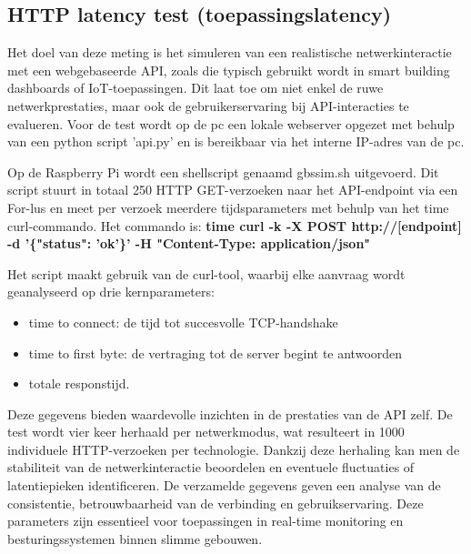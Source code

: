 \subsection{HTTP latency test (toepassingslatency)}
Het doel van deze meting is het simuleren van een realistische netwerkinteractie met een webgebaseerde API, zoals die typisch gebruikt wordt in smart building dashboards of IoT-toepassingen. Dit laat toe om niet enkel de ruwe netwerkprestaties, maar ook de gebruikerservaring bij API-interacties te evalueren.
Voor de test wordt op de pc een lokale webserver opgezet met behulp van een python script ’api.py’ en is bereikbaar via het interne IP-adres van de pc.


%    
%    
%    

Op de Raspberry Pi wordt een shellscript genaamd gbssim.sh uitgevoerd. Dit script stuurt in totaal 250 HTTP GET-verzoeken naar het API-endpoint via een For-lus en meet per verzoek meerdere tijdsparameters met behulp van het time curl-commando. Het commando is: \textbf{time curl -k -X POST http://[endpoint] -d '\{"status": 'ok'\}' -H "Content-Type: application/json"}

Het script maakt gebruik van de curl-tool, waarbij elke aanvraag wordt geanalyseerd op drie kernparameters: 
\begin{itemize}
    \item time to connect: de tijd tot succesvolle TCP-handshake
    \item time to first byte: de vertraging tot de server begint te antwoorden
    \item totale responstijd. 
\end{itemize}
Deze gegevens bieden waardevolle inzichten in de prestaties van de API zelf.
De test wordt vier keer herhaald per netwerkmodus, wat resulteert in 1000 individuele HTTP-verzoeken per technologie. Dankzij deze herhaling kan men de stabiliteit van de netwerkinteractie beoordelen en eventuele fluctuaties of latentiepieken identificeren.
De verzamelde gegevens geven een analyse van de  consistentie, betrouwbaarheid van de verbinding en gebruikservaring. Deze parameters zijn essentieel voor toepassingen in real-time monitoring en besturingssystemen binnen slimme gebouwen.



